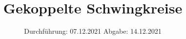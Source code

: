 

\subject{V355}
\title{Gekoppelte Schwingkreise}
\date{%
  Durchführung: 07.12.2021
  \hspace{3em}
  Abgabe: 14.12.2021
}



\maketitle
\thispagestyle{empty}
\tableofcontents
\newpage







\printbibliography{}


